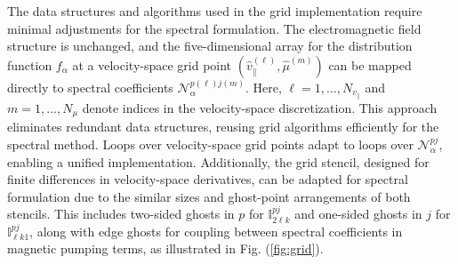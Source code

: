 \documentclass[preprint,12pt]{elsarticle}
\begin{document}
The data structures and algorithms used in the grid implementation require minimal adjustments for the spectral formulation. The electromagnetic field structure is unchanged, and the five-dimensional array for the distribution function $f_\alpha$ at a velocity-space grid point $(\hat{v}_\parallel^{(\ell)}, \hat{\mu}^{(m)})$ can be mapped directly to spectral coefficients $\mathcal{N}_\alpha^{p(\ell) j(m)}$. Here, $\ell = 1, \dots, N_{v_\parallel}$ and $m = 1, \dots, N_\mu$ denote indices in the velocity-space discretization. This approach eliminates redundant data structures, reusing grid algorithms efficiently for the spectral method. Loops over velocity-space grid points adapt to loops over $\mathcal{N}_\alpha^{pj}$, enabling a unified implementation. Additionally, the grid stencil, designed for finite differences in velocity-space derivatives, can be adapted for spectral formulation due to the similar sizes and ghost-point arrangements of both stencils. This includes two-sided ghosts in $p$ for $\mathbb{I}_{2\ell k}^{pj}$ and one-sided ghosts in $j$ for $\mathbb{I}_{\ell k1}^{pj}$, along with edge ghosts for coupling between spectral coefficients in magnetic pumping terms, as illustrated in Fig. (\ref{fig:grid}).

\end{document}
